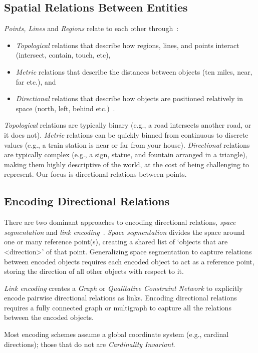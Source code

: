 \subsection{Spatial Relations Between Entities}
\par{
     \textit{Points, Lines} and \textit{Regions} relate to each other through~\cite{Carniel2020,Bertella2022,Carniel2023}:
    \begin{itemize}
        \item \textit{Topological} relations that describe how regions, lines, and points interact (intersect, contain, touch, etc),
        \item \textit{Metric} relations that describe the distances between objects (ten miles, near, far etc.), and
        \item \textit{Directional} relations that describe how objects are positioned relatively in space (north, left, behind etc.)~\cite{Carniel2020, Bertella2022, Carniel2023}.
    \end{itemize}

    \textit{Topological} relations are typically binary (e.g., a road intersects another road, or it does not). 
    \textit{Metric} relations can be quickly binned from continuous to discrete values (e.g., a train station is near or far from your house).
    \textit{Directional} relations are typically complex (e.g., a sign, statue, and fountain arranged in a triangle), making them highly descriptive of the world, at the cost of being challenging to represent.
    Our focus is directional relations between points. 

}

\subsection{Encoding Directional Relations}
\par{
    There are two dominant approaches to encoding directional relations, \textit{space segmentation} and \textit{link encoding}~\cite{Dellapenna2012, Dellapenna2017}.
%
    \textit{Space segmentation} divides the space around one or many reference point(s), creating a shared list of `objects that are <direction>' of that point. 
    Generalizing space segmentation to capture relations between encoded objects requires each encoded object to act as a reference point, storing the direction of all other objects with respect to it.
 
    \textit{Link encoding} creates a \textit{Graph} or \textit{Qualitative Constraint Network} to explicitly encode pairwise directional relations as links.
    Encoding directional relations requires a fully connected graph or multigraph to capture all the relations between the encoded objects.

    Most encoding schemes assume a global coordinate system (e.g., cardinal directions); those that do not are \textit{Cardinality Invariant}.

}


